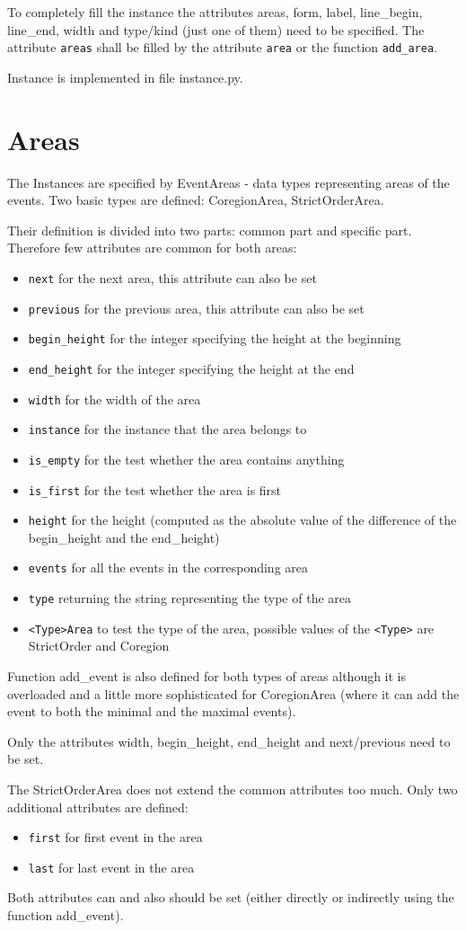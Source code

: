 \documentclass[11pt,oneside]{fithesis2}
\newcommand{\T}[1]{\texttt{#1}}
\newcommand{\ite}[1]{\item{\texttt{#1}}}
\begin{document}
To completely fill the instance the attributes areas, form, label, line\_begin, line\_end, width and type/kind (just one of them) need to be specified. The attribute \texttt{areas} shall be filled by the attribute \texttt{area} or the function \texttt{add\_area}.

Instance is implemented in file instance.py.


\section{Areas}
The Instances are specified by EventAreas - data types representing areas of the events. Two basic types are defined: CoregionArea, StrictOrderArea.

Their definition is divided into two parts: common part and specific part. Therefore few attributes are common for both areas:
\begin{itemize}
\ite{next} for the next area, this attribute can also be set
\ite{previous} for the previous area, this attribute can also be set
\ite{begin\_height} for the integer specifying the height at the beginning
\ite{end\_height} for the integer specifying the height at the end
\ite{width} for the width of the area
\ite{instance} for the instance that the area belongs to
\ite{is\_empty} for the test whether the area contains anything
\ite{is\_first} for the test whether the area is first
\ite{height} for the height (computed as the absolute value of the difference of the begin\_height and the end\_height)
\ite{events} for all the events in the corresponding area
\ite{type} returning the string representing the type of the area
\ite{<Type>Area} to test the type of the area, possible values of the \T{<Type>} are StrictOrder and Coregion
\end{itemize}

Function add\_event is also defined for both types of areas although it is overloaded and a little more sophisticated for CoregionArea (where it can add the event to both the minimal and the maximal events).

Only the attributes width, begin\_height, end\_height and next/previous need to be set.

The StrictOrderArea does not extend the common attributes too much. Only two additional attributes are defined:
\begin{itemize}
\ite{first} for first event in the area
\ite{last} for last event in the area
\end{itemize}

Both attributes can and also should be set (either directly or indirectly using the function add\_event).
\end{document}
